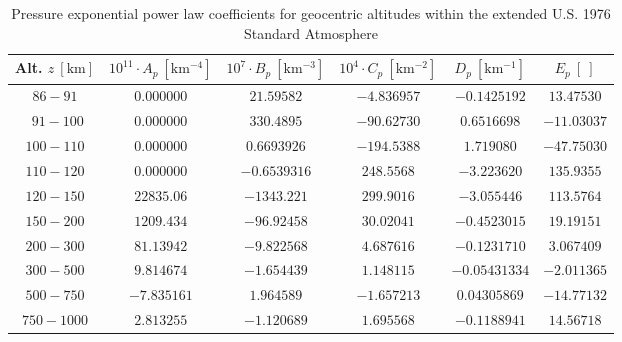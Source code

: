 \documentclass[11pt]{thesis}
\numberwithin{equation}{section}
\begin{document}
\begin{table}[H]
\caption{Pressure exponential power law coefficients for geocentric altitudes within the extended U.S. 1976 Standard Atmosphere} \label{tab:atmosExtendedP}
\centering
{\tabulinesep=1.0mm
\begin{tabu}{c | c | c | c | c | c}
Alt. $z \ [\si{\km}]$ & $10^{11} \cdot A_p \ [\si{\km^{-4}}]$ & $10^7 \cdot B_p \ [\si{\km^{-3}}]$ & $10^4 \cdot C_p \ [\si{\km^{-2}}]$ & $D_p \ [\si{\km^{-1}}]$ & $E_p \ [\ ]$ \\
\hline $86 - 91$   & $0.000000$ & $21.59582$ & $-4.836957$ & $-0.1425192$ & $13.47530$ \\
\hline $\,\ 91 - 100$  & $0.000000$ & $330.4895$ & $-90.62730$ & $0.6516698$ & $-11.03037$ \\
\hline $100 - 110$ & $0.000000$ & $0.6693926$ & $-194.5388$ & $1.719080$ & $-47.75030$ \\
\hline $110 - 120$ & $0.000000$ & $-0.6539316$ & $248.5568$ & $-3.223620$ & $135.9355$ \\
\hline $120 - 150$ & $22835.06$ & $-1343.221$ & $299.9016$ & $-3.055446$ & $113.5764$ \\
\hline $150 - 200$ & $1209.434$ & $-96.92458$ & $30.02041$ & $-0.4523015$ & $19.19151$ \\
\hline $200 - 300$ & $81.13942$ & $-9.822568$ & $4.687616$ & $-0.1231710$ & $3.067409$ \\
\hline $300 - 500$ & $9.814674$ & $-1.654439$ & $1.148115$ & $-0.05431334$ & $-2.011365$ \\
\hline $500 - 750$ & $-7.835161$ & $1.964589$ & $-1.657213$ & $0.04305869$ & $-14.77132$ \\
\hline $750 - 1000$ & $2.813255$ & $-1.120689$ & $1.695568$ & $-0.1188941$ & $14.56718$ \\
\end{tabu}}
\end{table}
\end{document}
